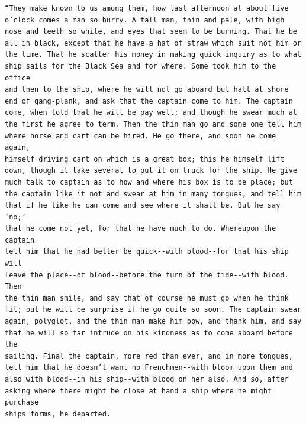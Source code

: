 \documentclass{article}
\begin{document}
\begin{verbatim}
“They make known to us among them, how last afternoon at about five
o’clock comes a man so hurry. A tall man, thin and pale, with high
nose and teeth so white, and eyes that seem to be burning. That he be
all in black, except that he have a hat of straw which suit not him or
the time. That he scatter his money in making quick inquiry as to what
ship sails for the Black Sea and for where. Some took him to the office
and then to the ship, where he will not go aboard but halt at shore
end of gang-plank, and ask that the captain come to him. The captain
come, when told that he will be pay well; and though he swear much at
the first he agree to term. Then the thin man go and some one tell him
where horse and cart can be hired. He go there, and soon he come again,
himself driving cart on which is a great box; this he himself lift
down, though it take several to put it on truck for the ship. He give
much talk to captain as to how and where his box is to be place; but
the captain like it not and swear at him in many tongues, and tell him
that if he like he can come and see where it shall be. But he say ‘no;’
that he come not yet, for that he have much to do. Whereupon the captain
tell him that he had better be quick--with blood--for that his ship will
leave the place--of blood--before the turn of the tide--with blood. Then
the thin man smile, and say that of course he must go when he think
fit; but he will be surprise if he go quite so soon. The captain swear
again, polyglot, and the thin man make him bow, and thank him, and say
that he will so far intrude on his kindness as to come aboard before the
sailing. Final the captain, more red than ever, and in more tongues,
tell him that he doesn’t want no Frenchmen--with bloom upon them and
also with blood--in his ship--with blood on her also. And so, after
asking where there might be close at hand a ship where he might purchase
ships forms, he departed.


\end{verbatim}
\end{document}
